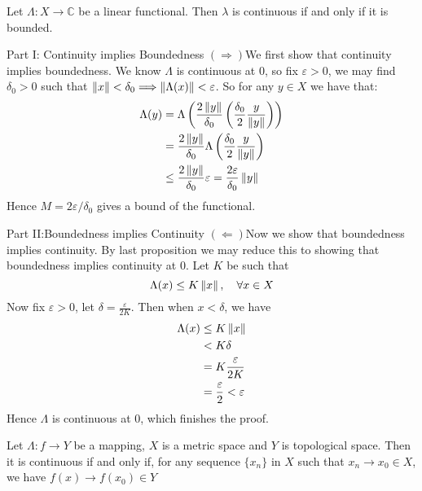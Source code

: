 \begin{proposition}\rm\nextline
	Let $\Lambda:X\xrightarrow{}\mathbb{C}$ be a linear functional. Then $\lambda$ is continuous if and only if it is bounded.
	\begin{pf}{Part I: Continuity implies Boundedness}{}
	$(\Longrightarrow)$We first show that continuity implies boundedness. We know $\Lambda$ is continuous at 0, so fix $\varepsilon>0$, we may find $\delta_0>0$ such that $\left\|{x}\right\|<\delta_0\Longrightarrow \left\|{\Lambda(x)}\right\|<\varepsilon$. So for any $y\in X$ we have that:
	\begin{equation}
		\begin{split}
			\Lambda(y)&=\Lambda\left(\frac{2\left\|{y}\right\|}{\delta_0}\left(\frac{\delta_0}{2}\frac{y}{\left\|{y}\right\|}\right)\right)\\
			&=\frac{2\left\|{y}\right\|}{\delta_0}\Lambda\left(\frac{\delta_0}{2}\frac{y}{\left\|{y}\right\|}\right)\\
			&\leq\frac{2\left\|{y}\right\|}{\delta_0}\varepsilon=\frac{2\varepsilon}{\delta_0}\left\|{y}\right\|
		\end{split}
	\end{equation}
	Hence $M=2\varepsilon/\delta_0$ gives a bound of the functional.
\end{pf}
\begin{pf}{Part II:Boundedness implies Continuity}{}
	$(\Longleftarrow)$Now we show that boundedness implies continuity. By last proposition we may reduce this to showing that boundedness implies continuity at 0. Let $K$ be such that
	$$
		\Lambda(x) \leq K\left\|{x}\right\|,\quad\forall x\in X
	$$
	Now fix $\varepsilon>0$, let $\delta=\frac{\varepsilon}{2K}$. Then when $x<\delta$, we have
	\begin{equation}
		\begin{split}
			\Lambda(x)&\leq K\left\|{x}\right\|\\
			&< K \delta\\
			&= K \frac{\varepsilon}{2K}\\&
			=\frac{\varepsilon}{2}<\varepsilon\\
		\end{split}
	\end{equation}
	Hence $\Lambda$ is continuous at 0, which finishes the proof.
\end{pf}
\end{proposition}

\begin{proposition}\rm
	Let $\Lambda:f\xrightarrow{}Y$ be a mapping, $X$ is a metric space and $Y$ is topological space. Then it is continuous if and only if, for any sequence $\{x_n\}$ in $X$ such that $x_n\longrightarrow{}x_0\in X$, we have $f(x)\longrightarrow{}f(x_0)\in Y$
\end{proposition}

